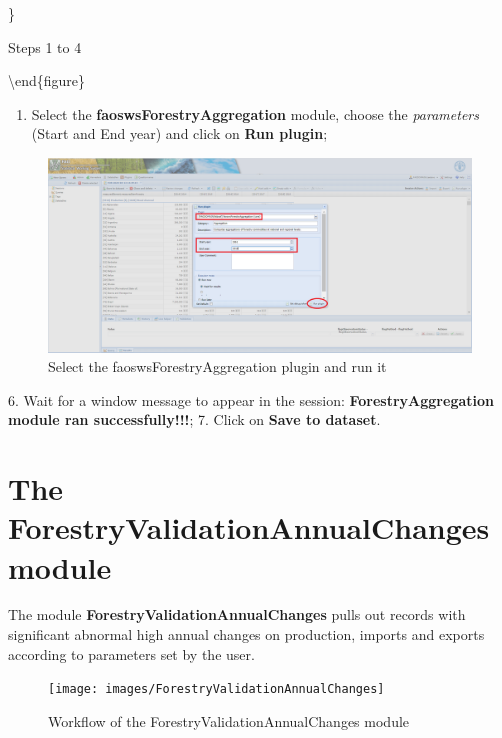\documentclass[
]{book}
\providecommand{\tightlist}{%
  \setlength{\itemsep}{0pt}\setlength{\parskip}{0pt}}
\begin{document}
\}

\caption{Steps 1 to 4}

\label{fig:queryAggregates}
\textbackslash end\{figure\}

\begin{enumerate}
\def\labelenumi{\arabic{enumi}.}
\setcounter{enumi}{4}
\tightlist
\item
  Select the \textbf{faoswsForestryAggregation} module, choose the \emph{parameters} (Start and End year) and click on \textbf{Run plugin};
\end{enumerate}

\begin{figure}

{\centering \includegraphics[width=1\linewidth]{images/aggregate_parameters} 

}

\caption{Select the faoswsForestryAggregation plugin and run it}\label{fig:AggregatePlugin}
\end{figure}

6. Wait for a window message to appear in the session: \textbf{ForestryAggregation module ran successfully!!!};
7. Click on \textbf{Save to dataset}.

\hypertarget{ForestryValidationAnnualChanges}{%
\chapter{\texorpdfstring{\textbf{The ForestryValidationAnnualChanges module}}{The ForestryValidationAnnualChanges module}}\label{ForestryValidationAnnualChanges}}

The module \textbf{ForestryValidationAnnualChanges} pulls out records with significant abnormal high annual changes on production, imports and exports according to parameters set by the user.

\begin{figure}

{\centering \texttt{[image: images/ForestryValidationAnnualChanges]} 

}

\caption{Workflow of the ForestryValidationAnnualChanges module}\label{fig:forestryAnnualChanges}
\end{figure}
\end{document}
